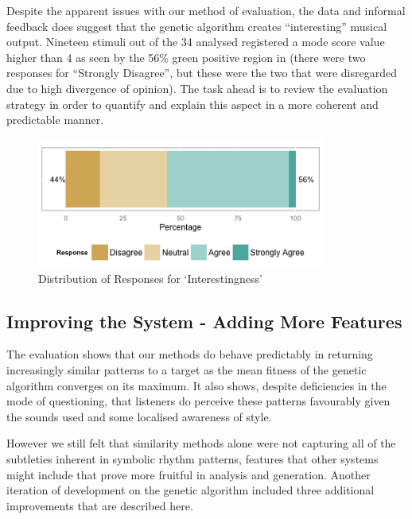 {{{Despite the apparent issues with our method of evaluation, the data and informal feedback does suggest that the genetic algorithm creates “interesting” musical output. Nineteen stimuli out of the 34 analysed registered a mode score value higher than 4 as seen by the 56\% green positive region in  (there were two responses for “Strongly Disagree”, but these were the two that were disregarded due to high divergence of opinion). The task ahead is to review the evaluation strategy in order to quantify and explain this aspect in a more coherent and predictable manner. 

\begin{figure}
	\begin{center}
		\includegraphics[width=0.85\textwidth]{ch03_symbolic/figures/interestingness.png}
	\end{center}
	\caption[Distribution of Responses for `Interestingness' in Symbolic Evaluation]{Distribution of Responses for `Interestingness'}
	\label{fig:interesting_distribution}
\end{figure}
		
\subsection{Improving the System - Adding More Features}

The evaluation shows that our methods do behave predictably in returning increasingly similar patterns to a target as the mean fitness of the genetic algorithm converges on its maximum. It also shows, despite deficiencies in the mode of questioning, that listeners do perceive these patterns favourably given the sounds used and some localised awareness of style.

However we still felt that similarity methods alone were not capturing all of the subtleties inherent in symbolic rhythm patterns, features that other systems might include that prove more fruitful in analysis and generation. Another iteration of development on the genetic algorithm included three additional improvements that are described here.

}}}
